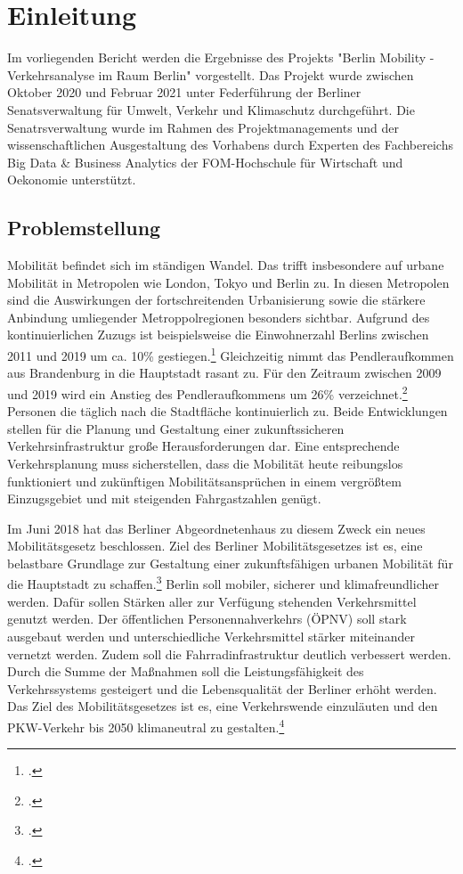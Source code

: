 \section{Einleitung}
Im vorliegenden Bericht werden die Ergebnisse des Projekts "Berlin Mobility - Verkehrsanalyse im Raum Berlin" vorgestellt. Das Projekt wurde zwischen Oktober 2020 und Februar 2021 unter Federführung der Berliner Senatsverwaltung für Umwelt, Verkehr und Klimaschutz durchgeführt. Die Senatrsverwaltung wurde im Rahmen des Projektmanagements und der wissenschaftlichen Ausgestaltung des Vorhabens durch Experten des Fachbereichs Big Data \& Business Analytics der FOM-Hochschule für Wirtschaft und Oekonomie unterstützt.

\subsection{Problemstellung}\label{problems}
Mobilität befindet sich im ständigen Wandel. Das trifft insbesondere auf urbane Mobilität in Metropolen wie London, Tokyo und Berlin zu. In diesen Metropolen sind die Auswirkungen der fortschreitenden Urbanisierung sowie die stärkere Anbindung umliegender Metroppolregionen besonders sichtbar. Aufgrund des kontinuierlichen Zuzugs ist beispielsweise die Einwohnerzahl Berlins zwischen 2011 und 2019 um ca. 10\% gestiegen.\footcite{Statista.2020} Gleichzeitig nimmt das Pendleraufkommen aus Brandenburg in die Hauptstadt rasant zu. Für den Zeitraum zwischen 2009 und 2019 wird ein Anstieg des Pendleraufkommens um 26\% verzeichnet.\footcite{VBB-Pendlerblatt.2020} Personen die täglich nach die Stadtfläche kontinuierlich zu. Beide Entwicklungen stellen für die Planung und Gestaltung einer zukunftssicheren Verkehrsinfrastruktur große Herausforderungen dar. Eine entsprechende Verkehrsplanung muss sicherstellen, dass die Mobilität heute reibungslos funktioniert und zukünftigen Mobilitätsansprüchen in einem vergrößtem Einzugsgebiet und mit steigenden Fahrgastzahlen genügt.

Im Juni 2018 hat das Berliner Abgeordnetenhaus zu diesem Zweck ein neues Mobilitätsgesetz beschlossen. Ziel des Berliner Mobilitätsgesetzes ist es, eine belastbare Grundlage zur Gestaltung einer zukunftsfähigen urbanen Mobilität für die Hauptstadt zu schaffen.\footcite{Mobilitaetsgesetz.2020} Berlin soll mobiler, sicherer und klimafreundlicher werden. Dafür sollen Stärken aller zur Verfügung stehenden Verkehrsmittel genutzt werden. Der öffentlichen Personennahverkehrs (ÖPNV) soll stark ausgebaut werden und unterschiedliche Verkehrsmittel stärker miteinander vernetzt werden. Zudem soll die Fahrradinfrastruktur deutlich verbessert werden. Durch die Summe der Maßnahmen soll die Leistungsfähigkeit des Verkehrssystems gesteigert und die Lebensqualität der Berliner erhöht werden. Das Ziel des Mobilitätsgesetzes ist es, eine Verkehrswende einzuläuten und den PKW-Verkehr bis 2050 klimaneutral zu gestalten.\footcite{Mobilitaetsgesetz.2020}

